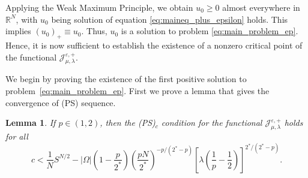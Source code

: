 \documentclass[11pt]{article}
\newtheorem{lemma}{Lemma}[section] %
\newcommand{\Jep}{\mathcal{J}_{\mu, \lambda}^{\varepsilon,+}}
\begin{document}
Applying the Weak Maximum Principle, we obtain \( u_0 \geq 0 \) almost everywhere in \( \mathbb{R}^N \), with $u_0$ being solution of equation \eqref{eq:maineq_plus_epsilon} holds. This implies $(u_0)_+ \equiv u_0$. Thus, \( u_0 \) is a solution to problem \eqref{eq:main_problem_ep}.
Hence, it is now sufficient to establish the existence of a nonzero critical point of the functional \( \Jep \).

We begin by proving the existence of the first positive solution to problem~\eqref{eq:main_problem_ep}. First we prove a lemma that gives the convergence of (PS) sequence. 
\begin{lemma}\label{lem:ps_sublinear}
If \( p \in (1, 2) \), then the (PS)\(_c\) condition for the functional \( \Jep \) holds for all    
\begin{equation*}
    c < \frac{1}{N} S^{N/2} 
    - |\Omega| \left(1 - \frac{ p}{2^*} \right) \left( \frac{pN}{2^*} \right)^{-p/(2^* - p)}
    \left[ \lambda \left( \frac{1}{p} - \frac{1}{2} \right) \right]^{2^*/(2^* - p)}.
\end{equation*}
\end{lemma}
\end{document}
